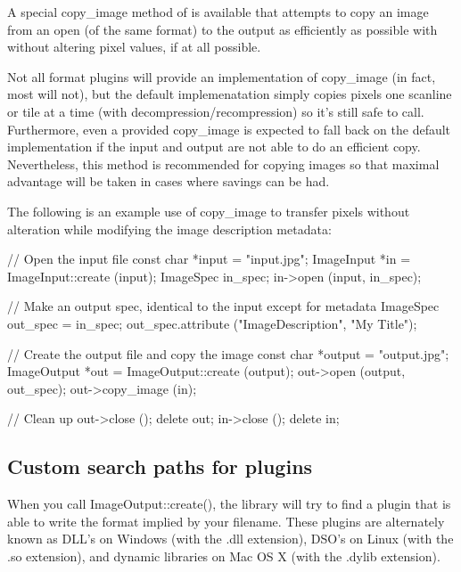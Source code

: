 A special {\cf copy_image} method of \ImageOutput is available that
attempts to copy an image from an open \ImageInput (of the same
format) to the output as efficiently as possible with without altering
pixel values, if at all possible.

Not all format plugins will provide an implementation of {\cf
  copy_image} (in fact, most will not), but the default implemenatation
simply copies pixels one scanline or tile at a time (with
decompression/recompression) so it's still safe to call.  Furthermore,
even a provided {\cf copy_image} is expected to fall back on the default
implementation if the input and output are not able to do an efficient
copy.  Nevertheless, this method is recommended
for copying images so that maximal advantage will be taken in cases
where savings can be had.

The following is an example use of {\cf copy_image} to transfer pixels
without alteration while modifying the image description metadata:

\begin{code}
    // Open the input file
    const char *input = "input.jpg";
    ImageInput *in = ImageInput::create (input);
    ImageSpec in_spec;
    in->open (input, in_spec);

    // Make an output spec, identical to the input except for metadata
    ImageSpec out_spec = in_spec;
    out_spec.attribute ("ImageDescription", "My Title");

    // Create the output file and copy the image
    const char *output = "output.jpg";
    ImageOutput *out = ImageOutput::create (output);
    out->open (output, out_spec);
    out->copy_image (in);

    // Clean up
    out->close ();
    delete out;
    in->close ();
    delete in;
\end{code}


\subsection{Custom search paths for plugins}
\label{sec:imageoutput:searchpaths}

When you call {\cf ImageOutput::create()}, the \product library will try
to find a plugin that is able to write the format implied by your
filename.  These plugins are alternately known as DLL's on Windows (with
the {\cf .dll} extension), DSO's on Linux (with the {\cf .so}
extension), and dynamic libraries on Mac OS X (with the {\cf .dylib}
extension).  

